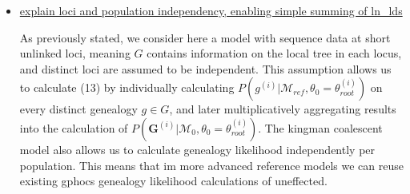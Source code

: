 \documentclass[11pt]{article}
\newcommand{\vect}[1]{\boldsymbol{\mathbf{#1}}}
\newcommand{\M}{\mathcal{M}}
\newcommand{\G}{\vect{G}}
\newcommand{\Mref}{\M_{ref}}
\newcommand{\troot}{\theta_{root}}
\begin{document}
\begin{itemize}
\item \underline{explain loci and population independency, enabling simple summing of ln\_lds}

As previously stated, we consider here a model with sequence data at short unlinked loci, meaning $G$ contains information on the local tree in each locus, and distinct loci are assumed to be independent. This assumption allows us to calculate (13) by individually calculating $P(g^{(i)} | \Mref, \theta_0=\troot^{(i)})$ on every distinct genealogy $g \in G$, and later multiplicatively aggregating results into the calculation of $P(\G^{(i)}|\M_0,\theta_0=\troot^{(i)})$. The kingman coalescent model also allows us to calculate genealogy likelihood independently per population. This means that im more advanced reference models we can reuse existing gphocs genealogy likelihood calculations of uneffected. 

\end{itemize}
\end{document}
